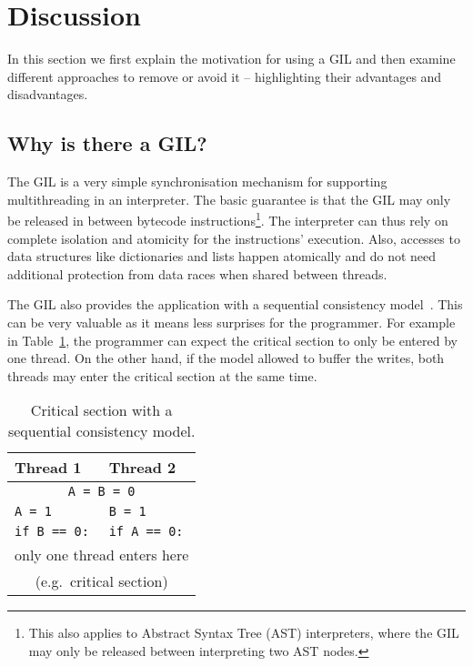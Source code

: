 \documentclass{sigplanconf}
\begin{document}
\section{Discussion}

In this section we first explain the motivation for using a GIL and
then examine different approaches to remove or avoid it -- highlighting
their advantages and disadvantages.


\subsection{Why is there a GIL?}
The GIL is a very simple synchronisation mechanism for supporting
multithreading in an interpreter. The basic guarantee is that the GIL
may only be released in between bytecode instructions\footnote{This
also applies to Abstract Syntax Tree (AST) interpreters, where the GIL
may only be released between interpreting two AST nodes.}. The interpreter
can thus rely on complete isolation and atomicity for the
instructions' execution. Also, accesses to data structures like
dictionaries and lists happen atomically and do not need additional
protection from data races when shared between threads.

The GIL also provides the application with a sequential consistency
model~\cite{lamport79}. This can be very valuable as it means less
surprises for the programmer. For example in Table~\ref{tab:seq_cons},
the programmer can expect the critical section to only be entered by
one thread.  On the other hand, if the model allowed to buffer the
writes, both threads may enter the critical section at the same time.

\begin{table}[!ht]
  \begin{center}
    \begin{tabular}{|l|l|}
      \hline
      Thread 1                      & Thread 2                      \\
      \hline
      \multicolumn{2}{|c|}{\texttt{A = B = 0}}                      \\
      \hline
      \texttt{A = 1}                & \texttt{B = 1}                \\
      \texttt{if B == 0:}           & \texttt{if A == 0:}           \\
      \multicolumn{2}{|c|}{only one thread enters here}             \\
      \multicolumn{2}{|c|}{(e.g.\ critical section)}             \\
      \hline
    \end{tabular}
    \caption{Critical section with a sequential consistency model.}
    \label{tab:seq_cons}
  \end{center}
\end{table}
\end{document}
